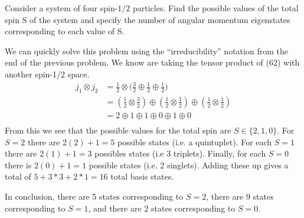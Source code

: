 \documentclass[a4paper, 11pt]{article}
\newenvironment{solution}{%
	\begin{list}{}{%
			\setlength{\topsep}{0pt}%
			\setlength{\leftmargin}{0.5cm}%
			\setlength{\rightmargin}{0.5cm}%
			\setlength{\listparindent}{\parindent}%
			\setlength{\itemindent}{\parindent}%
			\setlength{\parsep}{\parskip}%
		}%
		\item[]}{\end{list}}
\begin{document}
\begin{enumerate}[leftmargin=0em]
  \item  Consider a system of four spin-$1/2$ particles. Find the possible
    values of the total spin S of the system and specify the number of angular
    momentum eigenstates corresponding to each value of S.
    \begin{solution}
        We can quickly solve this problem using the ``irreducibility'' notation
        from the end of the previous problem. We know are taking the tensor
        product of (62) with another spin-1/2 space.
        \begin{align}
          j_1\otimes j_2 &= \frac{1}{2}\otimes\Big(\frac{3}{2}\oplus \frac{1}{2}\oplus\frac{1}{2}\Big) \\
                         &= \left(\frac{1}{2}\otimes\frac{3}{2}\right)\oplus\left( \frac{1}{2}\otimes\frac{1}{2} \right)\oplus \left( \frac{1}{2}\otimes\frac{1}{2} \right) \\
                         &= 2\oplus 1 \oplus 1 \oplus 0 \oplus 1 \oplus 0  \\
        \end{align}
        From this we see that the possible values for the total spin are
        $S\in\{2,1,0 \}$. For $S=2$ there are $2(2)+1=5$ possible states (i.e. a
        quintuplet). For each $S=1$ there are $2(1)+1=3$ possibles states (i.e
        3 triplets). Finally, for each $S=0$ there is $2(0)+1=1$ possible states (i.e.
        2 singlets). Adding these up gives a total of $5+3*3+2*1= 16$ total basis
        states.

        In conclusion, there are 5 states corresponding to $S=2$, there are $9$
        states corresponding to $S=1$, and there are $2$ states corresponding to
        $S=0$. 
    \end{solution}
    

    
\end{enumerate}
\end{document}
